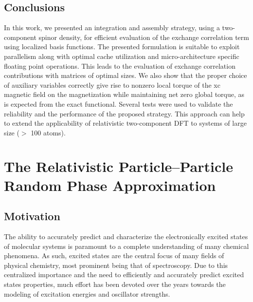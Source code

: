 \subsection{Conclusions}
In this work, we presented an integration and assembly strategy, 
using a two-component spinor density, for efficient evaluation
of the exchange correlation term using localized basis
functions. 
The presented formulation is suitable to exploit parallelism 
along with optimal cache utilization and micro-architecture specific floating point operations.
This leads to the evaluation of exchange correlation
contributions with matrices of optimal sizes. 
We also show that the proper choice of auxiliary variables 
correctly give rise to nonzero local torque of the xc magnetic field on the magnetization
while maintaining net zero global torque, as is expected from
the exact functional. 
Several tests were used to validate 
the reliability and the performance of the proposed strategy.
This approach can help to extend 
the applicability of relativistic two-component DFT 
to systems of large size ($>$ 100 atoms). 







\section{The Relativistic Particle--Particle Random Phase Approximation}

\subsection{Motivation}

The ability to accurately predict and characterize the electronically excited
states of molecular systems is paramount to a complete understanding of many
chemical phenomena. As such, excited states are the central focus of many
fields of physical chemistry, most prominent being that of spectroscopy. Due to
this centralized importance and the need to efficiently and accurately predict
excited states properties, much  effort has been devoted over the years towards
the modeling of excitation energies and oscillator strengths.


